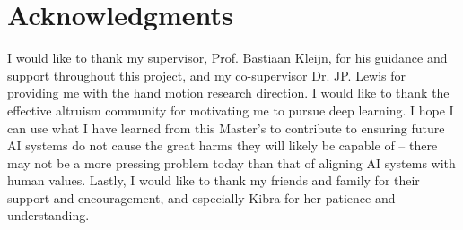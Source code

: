 \chapter*{Acknowledgments}
\label{C:ack}

I would like to thank my supervisor, Prof. Bastiaan Kleijn, for his guidance and support throughout this project, and my co-supervisor Dr. JP. Lewis for providing me with the hand motion research direction. I would like to thank the effective altruism community for motivating me to pursue deep learning. I hope I can use what I have learned from this Master's to contribute to ensuring future AI systems do not cause the great harms they will likely be capable of -- there may not be a more pressing problem today than that of aligning AI systems with human values. Lastly, I would like to thank my friends and family for their support and encouragement, and especially Kibra for her patience and understanding.
